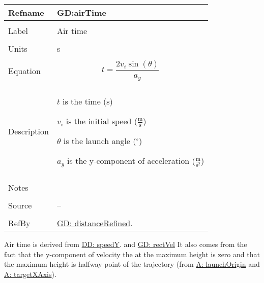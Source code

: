 \documentclass[12pt]{article}
\begin{document}
\noindent \begin{minipage}{\textwidth}
\begin{tabular}{p{} p{}}
\toprule \textbf{Refname} & \textbf{GD:airTime}
\label{GD:airTime}
\\ \midrule \\
Label & Air time
\\ \midrule \\
Units & s
\\ \midrule \\
Equation & \begin{displaymath}
           t=\frac{2 {v_{i}} \sin\left(θ\right)}{{a_{y}}}
           \end{displaymath}
\\ \midrule \\
Description & \begin{symbDescription}
              \item{$t$ is the time (s)}
              \item{${v_{i}}$ is the initial speed ($\frac{\text{m}}{\text{s}}$)}
              \item{$θ$ is the launch angle (${}^{\circ}$)}
              \item{${a_{y}}$ is the y-component of acceleration ($\frac{\text{m}}{\text{s}^{2}}$)}
              \end{symbDescription}
\\ \midrule \\
Notes & 
\\ \midrule \\
Source & --
\\ \midrule \\
RefBy & \hyperref[GD:distanceRefined]{GD: distanceRefined}.
\\ \bottomrule \end{tabular}
\end{minipage}
Air time is derived from \hyperref[DD:speedY]{DD: speedY}. and \hyperref[GD:rectVel]{GD: rectVel} It also comes from the fact that the y-component of velocity the at the maximum height is zero and that the maximum height is halfway point of the trajectory (from \hyperref[launchOrigin]{A: launchOrigin} and \hyperref[targetXAxis]{A: targetXAxis}).
\par~
\end{document}
